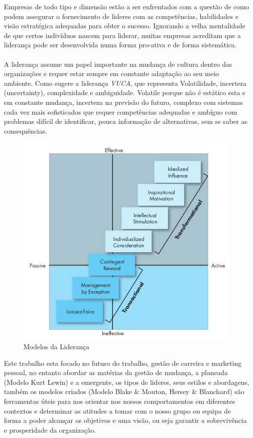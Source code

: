 Empresas de todo tipo e dimensão estão a ser enfrentados com a questão de como podem assegurar o fornecimento de lideres com as competências, habilidades e visão estratégica adequadas para obter o sucesso. Ignorando a velha mentalidade de que certos indivíduos nascem para liderar, muitas empresas acreditam que a liderança pode ser desenvolvida numa forma pro-ativa e de forma sistemática. \cite{book_6}\\
\\
A liderança assume um papel importante na mudança de cultura dentro das organizações e requer estar sempre em constante adaptação ao seu meio ambiente. Como sugere a liderança \textit{VUCA}, que representa Volatilidade, incerteza (uncertainty), complexidade e ambiguidade. Volatile porque não é estático esta e em constante mudança, incerteza na previsão do futuro, complexo com sistemas cada vez mais sofisticados que requer competências adequadas e ambíguo com problemas difícil de identificar, pouca informação de alternativas, sem se saber as consequências.
\begin{figure}[H]
	\centering
	\includegraphics[scale=0.52]{./image/Leadership/Leadership Models.jpg}
	\caption{Modelos da Liderança \cite{book_2}}
\end{figure}
Este trabalho esta focado no futuro do trabalho, gestão de carreira e marketing pessoal, no entanto abordar as matérias da gestão de mudança, a planeada (Modelo Kurt Lewin) e a emergente, os tipos de lideres, seus estilos e abordagens, também os modelos criados (Modelo Blake \& Mouton, Hersey \& Blanchard) são ferramentas úteis para nos orientar nos nossos comportamentos em diferentes contextos e determinar as atitudes a tomar com o nosso grupo ou equipa de forma a poder alcançar os objetivos e uma visão, ou seja garantir a sobrevivência e prosperidade da organização.
